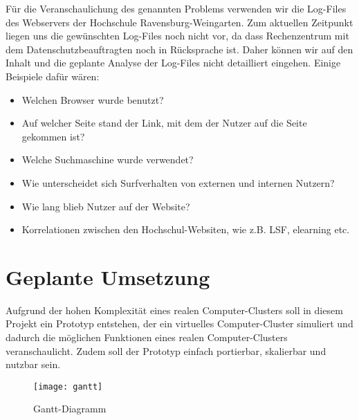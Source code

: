 Für die Veranschaulichung des genannten Problems verwenden wir die Log-Files des Webservers der Hochschule Ravensburg-Weingarten. Zum aktuellen Zeitpunkt liegen uns die gewünschten Log-Files noch nicht vor, da dass Rechenzentrum mit dem Datenschutzbeauftragten noch in Rücksprache ist. Daher können wir auf den Inhalt und die geplante Analyse der Log-Files nicht detailliert eingehen. Einige Beispiele dafür wären:
\begin{itemize}
\item Welchen Browser wurde benutzt?
\item Auf welcher Seite stand der Link, mit dem der Nutzer auf die Seite gekommen ist?
\item Welche Suchmaschine wurde verwendet?
\item Wie unterscheidet sich Surfverhalten von externen und internen Nutzern?
\item Wie lang blieb Nutzer auf der Website?
\item Korrelationen zwischen den Hochschul-Websiten, wie z.B. LSF, elearning etc.
\end{itemize}

\pagebreak

\section{Geplante Umsetzung}
\label{sec:GeplanteUmsetzung}

Aufgrund der hohen Komplexität eines realen Computer-Clusters soll in diesem Projekt ein Prototyp entstehen, der ein virtuelles Computer-Cluster simuliert und dadurch die möglichen Funktionen eines realen Computer-Clusters veranschaulicht. Zudem soll der Prototyp einfach portierbar, skalierbar und nutzbar sein.

\begin{figure}[!htb]
	\centering
	\texttt{[image: gantt]}
	\caption{Gantt-Diagramm}
	\label{img:gantt}
\end{figure} 